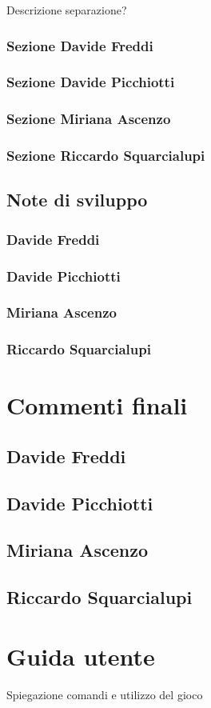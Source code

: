 \documentclass[a4paper,12pt]{report}
\begin{document}
Descrizione separazione?

\subsection{Sezione Davide Freddi}
\subsection{Sezione Davide Picchiotti}
\subsection{Sezione Miriana Ascenzo}
\subsection{Sezione Riccardo Squarcialupi}


\section{Note di sviluppo}

\subsection{Davide Freddi}
\subsection{Davide Picchiotti}
\subsection{Miriana Ascenzo}
\subsection{Riccardo Squarcialupi}

\chapter{Commenti finali}

\section{Davide Freddi}
\section{Davide Picchiotti}
\section{Miriana Ascenzo}
\section{Riccardo Squarcialupi}

\appendix
\chapter{Guida utente}

Spiegazione comandi e utilizzo del gioco



\end{document}
